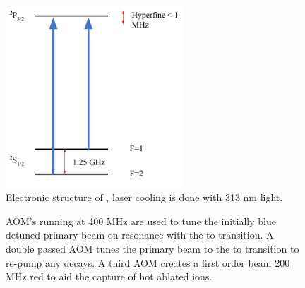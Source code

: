 \begin{figure}[H]
	\centering
	\includegraphics[width=0.6\textwidth]{images/Be_cooling.pdf}
	\caption{Electronic structure of , laser cooling is done with 313 nm light.}
	\label{fig: Be structure}
\end{figure}

\begin{figure}[H]
	\centering
	\caption{AOM's running at 400 MHz are used to tune the initially blue detuned primary beam on resonance with the  to  transition. A double passed AOM tunes the primary beam to the  to  transition to re-pump any  decays. A third AOM creates a first order beam 200 MHz red to aid the capture of hot ablated  ions.}
	\label{fig: AOMs}
\end{figure}


